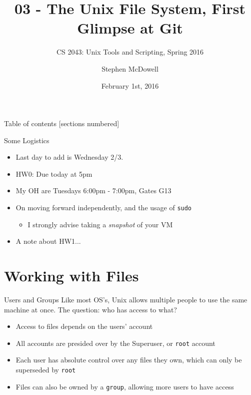 \documentclass[11pt]{beamer}
\title{03 \-- The Unix File System, First Glimpse at Git}
\subtitle{CS 2043: Unix Tools and Scripting, Spring 2016 \cite{prevSemesters}}
\date{February 1st, 2016}
\author{Stephen McDowell}
\institute{Cornell University}
\newcommand{\colbf}[1]{\textcolor{mLightBrown!77!black}{#1}}%
\begin{document}
\maketitle

\begin{frame}{Table of contents}
  [sections numbered]
  \tableofcontents[hideallsubsections]
\end{frame}

\begin{frame}{Some Logistics}
  \begin{itemize}[<+- | alert@+>]
    \item Last day to add is Wednesday 2/3.
    \item HW0: Due today at 5pm
    \item My OH are Tuesdays 6:00pm - 7:00pm, Gates G13
    \item On moving forward independently, and the usage of \texttt{sudo}
    \begin{itemize}[<+- | alert@+>]
      \item I strongly advise taking a \emph{snapshot} of your VM
    \end{itemize}
    \item A note about HW1...
  \end{itemize}
\end{frame}

%
\section{Working with Files}
\label{sec:working_with_files}

\begin{frame}[fragile]{Users and Groups}
  Like most OS's, Unix allows multiple people to use the same machine at once.  The question: who has access
  to what?

  \begin{itemize}[<+- | alert@+>]
    \item Access to files depends on the users' account
    \item All accounts are presided over by the \colbf{S}uper\colbf{u}ser, or \texttt{root} account
    \item Each user has absolute control over any files they own, which can only be superseded by \texttt{root}
    \item Files can also be owned by a \texttt{group}, allowing more users to have access
  \end{itemize}
\end{frame}
\end{document}
